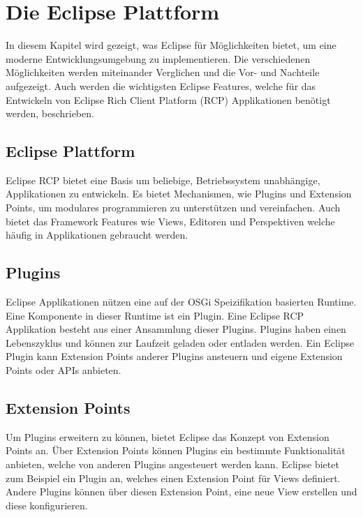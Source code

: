 \chapter{Die Eclipse Plattform}
\label{chap:platform}

In diesem Kapitel wird gezeigt, was Eclipse für Möglichkeiten bietet, um eine moderne Entwicklungsumgebung zu implementieren. Die verschiedenen Möglichkeiten werden miteinander Verglichen und die Vor- und Nachteile aufgezeigt. Auch werden die wichtigsten Eclipse Features, welche für das Entwickeln von Eclipse Rich Client Platform (RCP) Applikationen benötigt werden, beschrieben.

\section{Eclipse Plattform}

Eclipse RCP bietet eine Basis um beliebige, Betriebssystem unabhängige, Applikationen zu entwickeln. Es bietet Mechanismen, wie Plugins und Extension Points, um modulares programmieren zu unterstützen und vereinfachen. Auch bietet das Framework Features wie Views, Editoren und Perspektiven welche häufig in Applikationen gebraucht werden.

\section{Plugins}

Eclipse Applikationen nützen eine auf der OSGi Speizifikation basierten Runtime. Eine Komponente in dieser Runtime ist ein Plugin. Eine Eclipse RCP Applikation besteht aus einer Ansammlung dieser Plugins.\cite{whatisaplugin} Plugins haben einen Lebenszyklus und können zur Laufzeit geladen oder entladen werden. Ein Eclipse Plugin kann Extension Points anderer Plugins ansteuern und eigene Extension Points oder APIs anbieten.

\section{Extension Points}
\label{extensionpointssection}

Um Plugins erweitern zu können, bietet Eclipse das Konzept von Extension Points an. Über Extension Points können Plugins ein bestimmte Funktionalität anbieten, welche von anderen Plugins angesteuert werden kann. 
\newline
Eclipse bietet zum Beispiel ein Plugin an, welches einen Extension Point für Views definiert. Andere Plugins können über diesen Extension Point, eine neue View erstellen und diese konfigurieren. \cite{extensionpoints}


